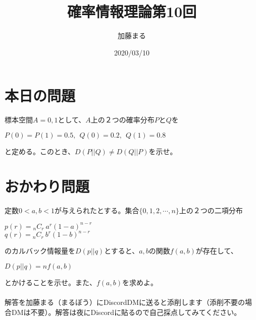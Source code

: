 \documentclass[a4j,uplatex,dvipdfmx]{jsarticle}
\title{確率情報理論第10回}
\author{加藤まる}
\date{2020/03/10}
\begin{document}
\maketitle

\section*{本日の問題}
標本空間$A={0,1}$として、$A$上の２つの確率分布$PとQ$を
\begin{center}
  $P(0)=P(1)=0.5,~~Q(0)=0.2,~~Q(1)=0.8$
\end{center}
と定める。このとき、$D(P||Q)\neq D(Q||P)$を示せ。


\section*{おかわり問題}
定数$0<a,b<1$が与えられたとする。集合$\{ 0,1,2,\cdots ,n \}$上の２つの二項分布
\begin{center}
  $p(r) = {}_nC_r~a^r (1-a)^{n-r}$\\
  $q(r) = {}_nC_r~b^r (1-b)^{n-r}$\\
\end{center}
のカルバック情報量を$D(p||q)$とすると、$a,b$の関数$f(a,b)$が存在して、
\begin{center}
  $D(p||q)=nf(a,b)$
\end{center}
とかけることを示せ。また、$f(a,b)$を求めよ。\\
\\
解答を加藤まる（まるぼう）にDiscordDMに送ると添削します（添削不要の場合DMは不要）。解答は夜にDiscordに貼るので自己採点してみてください。
\end{document}
